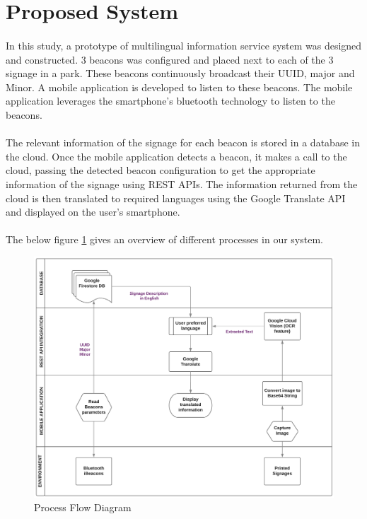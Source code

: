 \documentclass[12pt]{article}
\begin{document}

\section{Proposed System}
\label{system}
\paragraph{}In this study, a prototype of multilingual information service system was designed and constructed. 3 beacons was configured and placed next to each of the 3 signage in a park. These beacons continuously broadcast their UUID, major and Minor. A mobile application is developed to listen to these beacons. The mobile application leverages the smartphone’s bluetooth technology to listen to the beacons.

\paragraph{}The relevant information of the signage for each beacon is stored in a database in the cloud. Once the mobile application detects a beacon, it makes a call to the cloud, passing the detected beacon configuration to get the appropriate information of the signage using REST APIs. The information returned from the cloud is then translated to required languages using the Google Translate API and displayed on the user’s smartphone.

\paragraph{}The below figure \ref{fig:system} gives an overview of different processes in our system.

\begin{figure}[H]
	\centering
	\includegraphics[width=1\linewidth]{media/Architecture-3.png}
	\caption{Process Flow Diagram}
	\label{fig:system}
\end{figure} 
\end{document}
